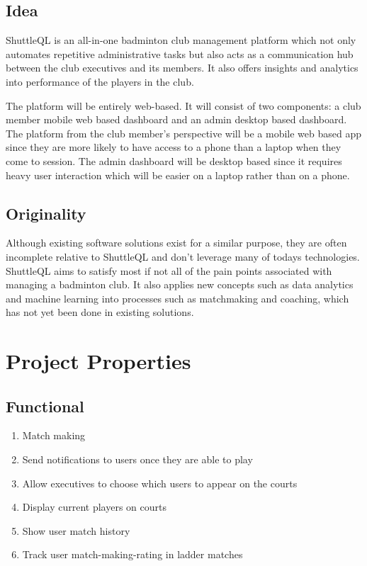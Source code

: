 \documentclass{article}
\begin{document}
\subsection{Idea}
ShuttleQL is an all-in-one badminton club management platform which not only
automates repetitive administrative tasks but also acts as a communication hub
between the club executives and its members. It also offers insights and
analytics into performance of the players in the club.

The platform will be entirely web-based. It will consist of two components:
a club member mobile web based dashboard and an admin desktop based dashboard.
The platform from the club member's perspective will be a mobile web based app
since they are more likely to have access to a phone than a laptop when they
come to session. The admin dashboard will be desktop based since it requires
heavy user interaction which will be easier on a laptop rather than on a phone.

\subsection{Originality}
Although existing software solutions exist for a similar purpose, they are often
incomplete relative to ShuttleQL and don't leverage many of todays technologies.
ShuttleQL aims to satisfy most if not all of the pain points associated with
managing a badminton club. It also applies new concepts such as data analytics and
machine learning into processes such as matchmaking and coaching, which has not
yet been done in existing solutions.

\newpage

\section{Project Properties}
\subsection{Functional}
\begin{enumerate}
  \item Match making
  \item Send notifications to users once they are able to play
  \item Allow executives to choose which users to appear on the courts
  \item Display current players on courts
  \item Show user match history
  \item Track user match-making-rating in ladder matches
\end{enumerate}
\end{document}
